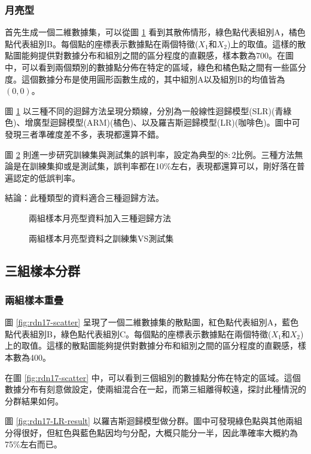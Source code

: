 \subsubsection{月亮型}
首先生成一個二維數據集，可以從圖 \ref{fig:rdn16-LARline} 看到其散佈情形，綠色點代表組別A，橘色點代表組別B。每個點的座標表示數據點在兩個特徵($X_1$和$X_2$)上的取值。這樣的散點圖能夠提供對數據分布和組別之間的區分程度的直觀感，樣本數為700。在圖中，可以看到兩個類別的數據點分佈在特定的區域，綠色和橘色點之間有一些區分度。這個數據分布是使用圓形函數生成的，其中組別A以及組別B的均值皆為$(0,0)$。

圖 \ref{fig:rdn16-LARline} 以三種不同的迴歸方法呈現分類線，分別為一般線性迴歸模型(SLR)(青綠色)、增廣型迴歸模型(ARM)(橘色)、以及羅吉斯迴歸模型(LR)(咖啡色)。圖中可發現三者準確度差不多，表現都還算不錯。

圖 \ref{fig:rdn16-LARline2} 則進一步研究訓練集與測試集的誤判率，設定為典型的$8:2$比例。三種方法無論是在訓練集抑或是測試集，誤判率都在10\%左右，表現都還算可以，剛好落在普遍認定的低誤判率。

結論：此種類型的資料適合三種迴歸方法。
\begin{figure}[h]
    \caption{兩組樣本月亮型資料加入三種迴歸方法}
    \label{fig:rdn16-LARline}
\end{figure}
\begin{figure}[h]
    \caption{兩組樣本月亮型資料之訓練集VS測試集}
    \label{fig:rdn16-LARline2}
\end{figure}
\subsection{三組樣本分群}
\subsubsection{兩組樣本重疊}
圖 \ref{fig:rdn17-scatter} 呈現了一個二維數據集的散點圖，紅色點代表組別A，藍色點代表組別B，綠色點代表組別C。每個點的座標表示數據點在兩個特徵($X_1$和$X_2$)上的取值。這樣的散點圖能夠提供對數據分布和組別之間的區分程度的直觀感，樣本數為400。

在圖 \ref{fig:rdn17-scatter} 中，可以看到三個組別的數據點分佈在特定的區域。這個數據分布有刻意做設定，使兩組混合在一起，而第三組離得較遠，探討此種情況的分群結果如何。

圖 \ref{fig:rdn17-LR-result} 以羅吉斯迴歸模型做分群。圖中可發現綠色點與其他兩組分得很好，但紅色與藍色點因均勻分配，大概只能分一半，因此準確率大概約為75\%左右而已。

